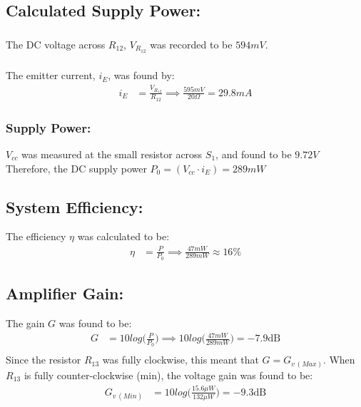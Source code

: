 \subsection{Calculated Supply Power: }
\subsubsection{} 
  The DC voltage across $R_{12}$, $V_{R_{12}}$ was recorded to be
  $\boxed{594 mV}$.
  \subsubsection{}
  The emitter current, $i_E$, was found by:
  \begin{align*}
    i_E &= \frac{V_{R_{12}}}{R_{12}}
    \implies \frac{595mV}{20\Omega}=\boxed{29.8 mA}
  \end{align*}
  \subsubsection{Supply Power: }
    $V_{cc}$ was measured at the small resistor across $S_1$, and found to
    be $\boxed{9.72 V}$ Therefore, the DC supply power $P_0 =
    (V_{cc}\cdot i_E)=\boxed{289 mW}$

\subsection{System Efficiency: \bm{$\eta$}}
  The efficiency $\eta$ was calculated to be:
  \begin{align*}
    \eta &= \frac{P}{P_0}
    \implies \frac{47mW}{289mW}\approx\boxed{16\%} 
  \end{align*}

\subsection{Amplifier Gain: }
  The gain $G$ was found to be:
  \begin{align*}
    G &= 10log\bigg(\frac{P}{P_0}\bigg) 
    \implies 10log\bigg( \frac{47mW}{289mW}\bigg)=\boxed{-7.9\text{dB}}\\
  \end{align*}
  Since the resistor $R_{13}$ was fully clockwise, this meant that $G =
  G_{v\,(Max)}$.
When $R_{13}$ is fully counter-clockwise (min), the voltage gain was found to be:
\begin{align*}
  G_{v\, (Min)} &= 10log\bigg(\frac{15.6 \mu W}{132\mu W}\bigg) =\boxed{-9.3\text{dB}}
\end{align*}

